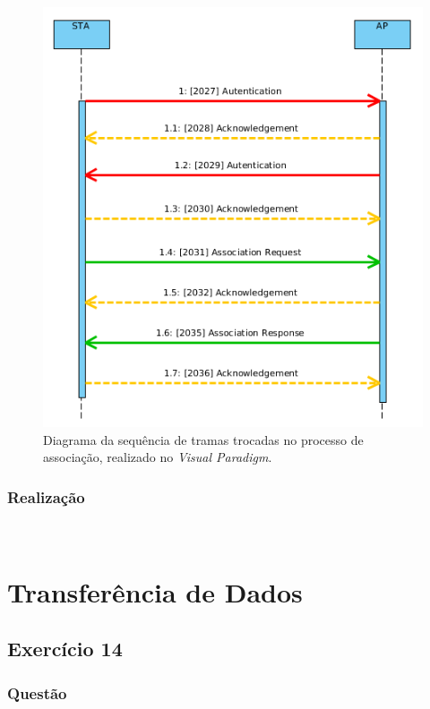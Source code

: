 \documentclass{llncs}
\begin{document}
\begin{figure}
  \begin{center}
  \includegraphics[scale=0.6]{./imagens/diag_assoc_seq.png} 
  \end{center}
  \caption{Diagrama da sequência de tramas trocadas no processo de associação, realizado no \textit{Visual Paradigm}.}
  \label{fig:diag_assoc_seq}
\end{figure}

\subsubsection{Realização}\rule[-10pt]{0pt}{10pt}\\



\clearpage

\section{Transferência de Dados}
\subsection{Exercício 14}
\subsubsection{Questão}\rule[-10pt]{0pt}{10pt}\\
\end{document}
